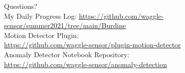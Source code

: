 \documentclass[10pt]{beamer}
\begin{document}
{
\begin{frame}[standout]
  Questions?\\[10mm]
  \small{
  My Daily Progress Log:
  \href{https://github.com/waggle-sensor/summer2021/tree/main/Burdine}{https://github.com/waggle-sensor/summer2021/tree/main/Burdine}\\[6mm]
  Motion Detector Plugin:\\[2mm]
  \href{https://github.com/waggle-sensor/plugin-motion-detector}{https://github.com/waggle-sensor/plugin-motion-detector}}\\[6mm]
  Anomaly Detector Notebook Repository:\\[2mm]
  \href{https://github.com/waggle-sensor/anomaly-detection}{https://github.com/waggle-sensor/anomaly-detection}
\end{frame}
}

%
%
%
%
%
\end{document}
